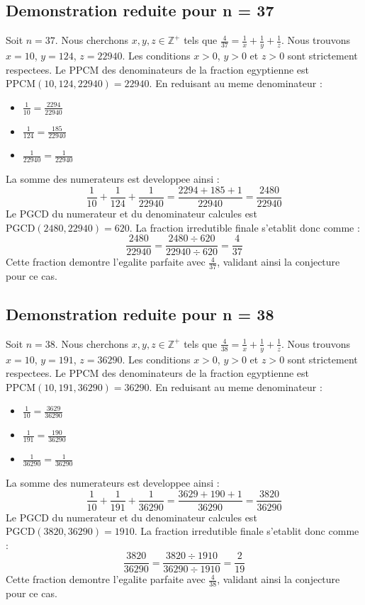 \documentclass[11pt,a4paper]{article}
\begin{document}
\subsection{Demonstration reduite pour n = 37}
Soit $n = 37$. Nous cherchons $x, y, z \in \mathbb{Z}^{+}$ tels que $\frac{4}{37} = \frac{1}{x} + \frac{1}{y} + \frac{1}{z}$.
Nous trouvons $x = 10$, $y = 124$, $z = 22940$.
Les conditions $x > 0$, $y > 0$ et $z > 0$ sont strictement respectees.
Le PPCM des denominateurs de la fraction egyptienne est $\text{PPCM}(10, 124, 22940) = 22940$.
En reduisant au meme denominateur :
\begin{itemize}
    \item $\frac{1}{10} = \frac{2294}{22940}$
    \item $\frac{1}{124} = \frac{185}{22940}$
    \item $\frac{1}{22940} = \frac{1}{22940}$
\end{itemize}
La somme des numerateurs est developpee ainsi :
$$ \frac{1}{10} + \frac{1}{124} + \frac{1}{22940} = \frac{2294 + 185 + 1}{22940} = \frac{2480}{22940} $$
Le PGCD du numerateur et du denominateur calcules est $\text{PGCD}(2480, 22940) = 620$.
La fraction irredutible finale s'etablit donc comme :
$$ \frac{2480}{22940} = \frac{2480 \div 620}{22940 \div 620} = \frac{4}{37} $$
Cette fraction demontre l'egalite parfaite avec $\frac{4}{37}$, validant ainsi la conjecture pour ce cas.

\subsection{Demonstration reduite pour n = 38}
Soit $n = 38$. Nous cherchons $x, y, z \in \mathbb{Z}^{+}$ tels que $\frac{4}{38} = \frac{1}{x} + \frac{1}{y} + \frac{1}{z}$.
Nous trouvons $x = 10$, $y = 191$, $z = 36290$.
Les conditions $x > 0$, $y > 0$ et $z > 0$ sont strictement respectees.
Le PPCM des denominateurs de la fraction egyptienne est $\text{PPCM}(10, 191, 36290) = 36290$.
En reduisant au meme denominateur :
\begin{itemize}
    \item $\frac{1}{10} = \frac{3629}{36290}$
    \item $\frac{1}{191} = \frac{190}{36290}$
    \item $\frac{1}{36290} = \frac{1}{36290}$
\end{itemize}
La somme des numerateurs est developpee ainsi :
$$ \frac{1}{10} + \frac{1}{191} + \frac{1}{36290} = \frac{3629 + 190 + 1}{36290} = \frac{3820}{36290} $$
Le PGCD du numerateur et du denominateur calcules est $\text{PGCD}(3820, 36290) = 1910$.
La fraction irredutible finale s'etablit donc comme :
$$ \frac{3820}{36290} = \frac{3820 \div 1910}{36290 \div 1910} = \frac{2}{19} $$
Cette fraction demontre l'egalite parfaite avec $\frac{4}{38}$, validant ainsi la conjecture pour ce cas.
\end{document}
